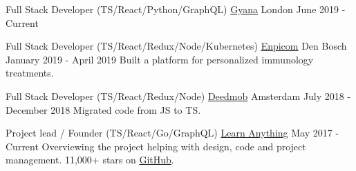 
\begin{cventries}

  \cventry
    {Full Stack Developer (TS/React/Python/GraphQL)}
    {\href{https://www.gyana.co.uk}{Gyana}}
    {London}
    {June 2019 - Current}
    {
      {}
    }

  \cventry
    {Full Stack Developer (TS/React/Redux/Node/Kubernetes)}
    {\href{https://www.enpicom.com}{Enpicom}}
    {Den Bosch}
    {January 2019 - April 2019}
    {
      {Built a platform for personalized immunology treatments.}
    }

  \cventry
    {Full Stack Developer (TS/React/Redux/Node)}
    {\href{https://www.deedmob.com}{Deedmob}}
    {Amsterdam}
    {July 2018 - December 2018}
    {
      {Migrated code from JS to TS.}
    }

  \cventry
    {Project lead / Founder (TS/React/Go/GraphQL)}
    {\href{https://learn-anything.xyz}{Learn Anything}}
    {}
    {May 2017 - Current}
    {
      {Overviewing the project helping with design, code and project management. 11,000+ stars on \href{https://github.com/learn-anything/learn-anything}{GitHub}.}
    }

\end{cventries}
